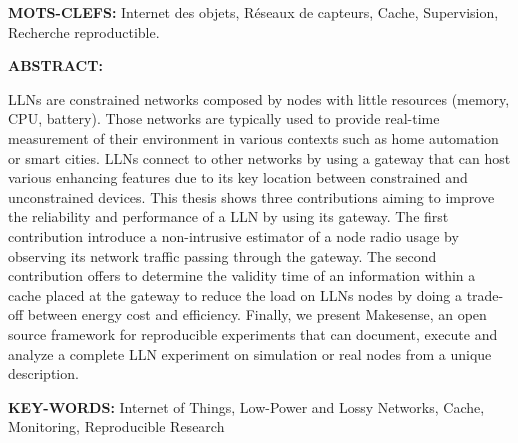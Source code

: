 \textbf{MOTS-CLEFS:} Internet des objets, Réseaux de capteurs, Cache, Supervision, Recherche reproductible.

\vspace{1.0cm}

\textbf{ABSTRACT:}

\acf{LLN}s are constrained networks composed by nodes with little resources (memory, CPU, battery).
Those networks are typically used to provide real-time measurement of their environment in various contexts such as home automation or smart cities.
\ac{LLN}s connect to other networks by using a gateway that can host various enhancing features due to its key location between constrained and unconstrained devices.
This thesis shows three contributions aiming to improve the reliability and performance of a \ac{LLN} by using its gateway.
The first contribution introduce a non-intrusive estimator of a node radio usage by observing its network traffic passing through the gateway.
The second contribution offers to determine the validity time of an information within a cache placed at the gateway to reduce the load on \ac{LLN}s nodes by doing a trade-off between energy cost and efficiency.
Finally, we present Makesense, an open source framework for reproducible experiments that can document, execute and analyze a complete \ac{LLN} experiment on simulation or real nodes from a unique description.

\vspace{.6cm}
\textbf{KEY-WORDS:} Internet of Things, Low-Power and Lossy Networks, Cache, Monitoring, Reproducible Research

\restoregeometry
